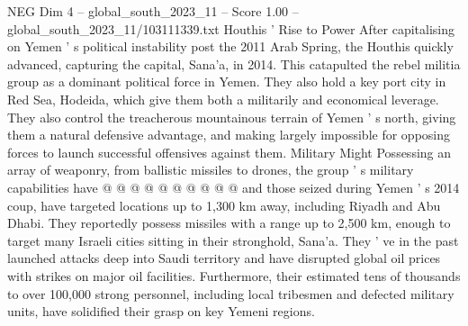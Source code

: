 \begin{textsample}{NEG Dim 4 – global\_south\_2023\_11 – Score 1.00 – global\_south\_2023\_11/103111339.txt}
Houthis ' Rise to Power After capitalising on Yemen ' s political instability post the 2011 Arab Spring, the Houthis quickly advanced, capturing the capital, Sana'a, in 2014.
This catapulted the rebel militia group as a dominant political force in Yemen.
They also hold a key port city in Red Sea, Hodeida, which give them both a militarily and economical leverage.
They also control the treacherous mountainous terrain of Yemen ' s north, giving them a natural defensive advantage, and making largely impossible for opposing forces to launch successful offensives against them.
Military Might Possessing an array of weaponry, from ballistic missiles to drones, the group ' s military capabilities have @ @ @ @ @ @ @ @ @ @ and those seized during Yemen ' s 2014 coup, have targeted locations up to 1,300 km away, including Riyadh and Abu Dhabi.
They reportedly possess missiles with a range up to 2,500 km, enough to target many Israeli cities sitting in their stronghold, Sana'a.
They ' ve in the past launched attacks deep into Saudi territory and have disrupted global oil prices with strikes on major oil facilities.
Furthermore, their estimated tens of thousands to over 100,000 strong personnel, including local tribesmen and defected military units, have solidified their grasp on key Yemeni regions.

\end{textsample}
